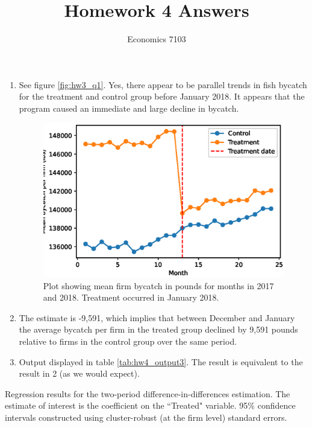 \documentclass{article}
\title{Homework 4 Answers}
\author{Economics 7103}
\date{ }
\begin{document}
  
\maketitle

\begin{enumerate}
\item See figure \ref{fig:hw3_q1}.  Yes, there appear to be parallel trends in fish bycatch for the treatment and control group before January 2018.  It appears that the program caused an immediate and large decline in bycatch.
\begin{figure}[h]
    \centering
    \includegraphics[scale = 0.7]{hw4_q1.eps}
    \caption{Plot showing mean firm bycatch in pounds for months in 2017 and 2018.  Treatment occurred in January 2018.}
    \label{fig:hw4_q1}
\end{figure}
\item The estimate is -9,591, which implies that between December and January the average bycatch per firm in the treated group declined by 9,591 pounds relative to firms in the control group over the same period.
\item Output displayed in table \ref{tab:hw4_output3}.  The result is equivalent to the result in 2 (as we would expect).
\end{enumerate}

\begin{table}[h]
    \centering
    
    \caption{Regression results for the two-period difference-in-differences estimation.  The estimate of interest is the coefficient on the ``Treated" variable. 95\% confidence intervals constructed using cluster-robust (at the firm level) standard errors.}
    \label{tab:hw3_output3}
\end{table}
\end{document}
